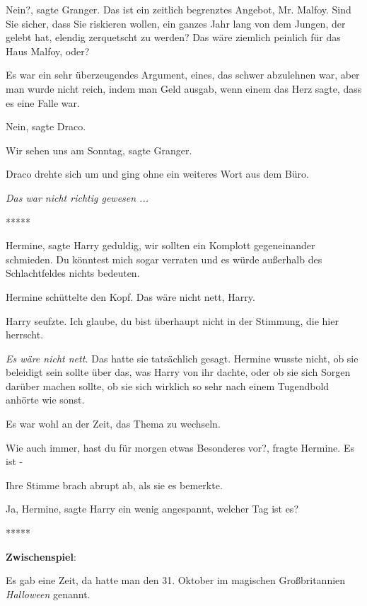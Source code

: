 \glqq{}Nein?\grqq{}, sagte Granger. \glqq{}Das ist ein zeitlich begrenztes
Angebot, Mr. Malfoy. Sind Sie sicher, dass Sie riskieren wollen, ein ganzes Jahr
lang von dem Jungen, der gelebt hat, elendig zerquetscht zu werden? Das wäre
ziemlich peinlich für das Haus Malfoy, oder?\grqq{}

Es war ein sehr überzeugendes Argument, eines, das schwer abzulehnen war, aber
man wurde nicht reich, indem man Geld ausgab, wenn einem das Herz sagte, dass es
eine Falle war.

\glqq{}Nein\grqq{}, sagte Draco.

\glqq{}Wir sehen uns am Sonntag\grqq{}, sagte Granger.

Draco drehte sich um und ging ohne ein weiteres Wort aus dem Büro.

\emph{Das war nicht richtig gewesen ...}

\begin{center}*****\end{center}

\glqq{}Hermine\grqq{}, sagte Harry geduldig, \glqq{}wir sollten ein Komplott
gegeneinander schmieden. Du könntest mich sogar verraten und es würde außerhalb
des Schlachtfeldes nichts bedeuten.\grqq{}

Hermine schüttelte den Kopf. \glqq{}Das wäre nicht nett, Harry.\grqq{}

Harry seufzte. \glqq{}Ich glaube, du bist überhaupt nicht in der Stimmung, die
hier herrscht.\grqq{}

\emph{Es wäre nicht nett.} Das hatte sie tatsächlich gesagt. Hermine wusste
nicht, ob sie beleidigt sein sollte über das, was Harry von ihr dachte, oder ob
sie sich Sorgen darüber machen sollte, ob sie sich wirklich so sehr nach einem
Tugendbold anhörte wie sonst.

Es war wohl an der Zeit, das Thema zu wechseln.

\glqq{}Wie auch immer, hast du für morgen etwas Besonderes vor?\grqq{}, fragte
Hermine. \glqq{}Es ist -

\grqq{}Ihre Stimme brach abrupt ab, als sie es bemerkte.

\glqq{}Ja, Hermine\grqq{}, sagte Harry ein wenig angespannt, \glqq{}welcher Tag
ist es?\grqq{}

\begin{center}*****\end{center}

\textbf{Zwischenspiel}:

Es gab eine Zeit, da hatte man den 31. Oktober im magischen Großbritannien
\emph{Halloween} genannt.

